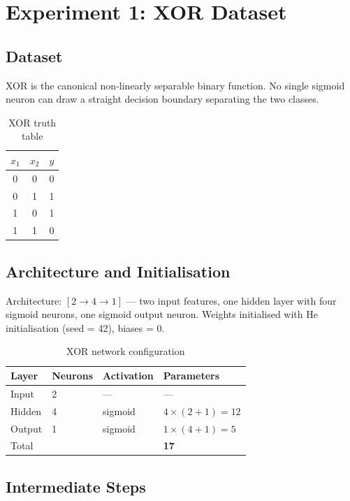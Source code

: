 \documentclass[12pt,a4paper]{article}
\begin{document}
\section{Experiment 1: XOR Dataset}

\subsection{Dataset}

XOR is the canonical non-linearly separable binary function.
No single sigmoid neuron can draw a straight decision boundary separating the two classes.

\begin{table}[H]
\centering
\caption{XOR truth table}
\begin{tabular}{ccc}
\toprule
$x_1$ & $x_2$ & $y$ \\
\midrule
0 & 0 & 0 \\
0 & 1 & 1 \\
1 & 0 & 1 \\
1 & 1 & 0 \\
\bottomrule
\end{tabular}
\end{table}

\subsection{Architecture and Initialisation}

Architecture: $[2 \to 4 \to 1]$ --- two input features, one hidden layer with four sigmoid
neurons, one sigmoid output neuron.
Weights initialised with He initialisation (seed = 42), biases = 0.

\begin{table}[H]
\centering
\caption{XOR network configuration}
\begin{tabular}{llll}
\toprule
Layer & Neurons & Activation & Parameters \\
\midrule
Input  & 2 & ---      & --- \\
Hidden & 4 & sigmoid  & $4 \times (2 + 1) = 12$ \\
Output & 1 & sigmoid  & $1 \times (4 + 1) = 5$ \\
\midrule
Total  &   &          & \textbf{17} \\
\bottomrule
\end{tabular}
\end{table}

\subsection{Intermediate Steps}
\end{document}
